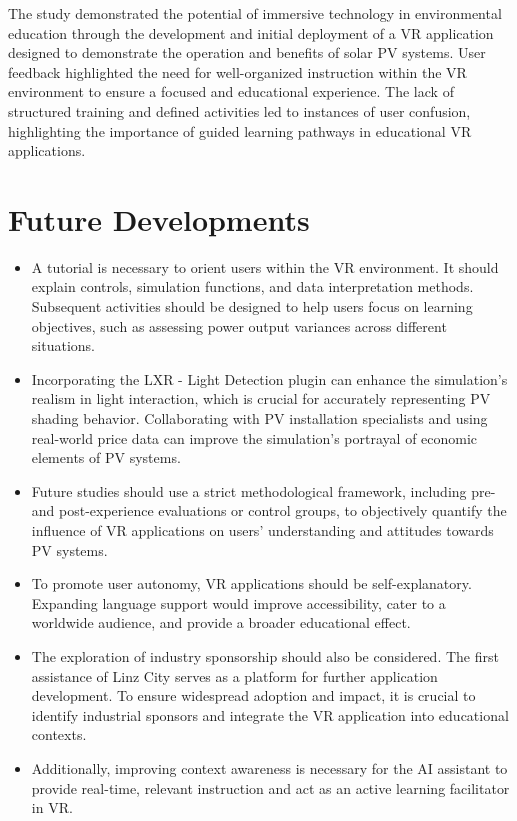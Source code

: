 \documentclass[draft, final]{vutinfth} %
\begin{document}
The study demonstrated the potential of immersive technology in environmental education through the development and initial deployment of a VR application designed to demonstrate the operation and benefits of solar PV systems. User feedback highlighted the need for well-organized instruction within the VR environment to ensure a focused and educational experience. The lack of structured training and defined activities led to instances of user confusion, highlighting the importance of guided learning pathways in educational VR applications.

\section{Future Developments}
\begin{itemize}
    \item A tutorial is necessary to orient users within the VR environment. It should explain controls, simulation functions, and data interpretation methods. Subsequent activities should be designed to help users focus on learning objectives, such as assessing power output variances across different situations.
    \item Incorporating the LXR - Light Detection plugin can enhance the simulation's realism in light interaction, which is crucial for accurately representing PV shading behavior. Collaborating with PV installation specialists and using real-world price data can improve the simulation's portrayal of economic elements of PV systems.
    \item Future studies should use a strict methodological framework, including pre- and post-experience evaluations or control groups, to objectively quantify the influence of VR applications on users' understanding and attitudes towards PV systems.
    \item To promote user autonomy, VR applications should be self-explanatory. Expanding language support would improve accessibility, cater to a worldwide audience, and provide a broader educational effect.
    \item The exploration of industry sponsorship should also be considered. The first assistance of Linz City serves as a platform for further application development. To ensure widespread adoption and impact, it is crucial to identify industrial sponsors and integrate the VR application into educational contexts.
    \item Additionally, improving context awareness is necessary for the AI assistant to provide real-time, relevant instruction and act as an active learning facilitator in VR.
\end{itemize}
\end{document}
